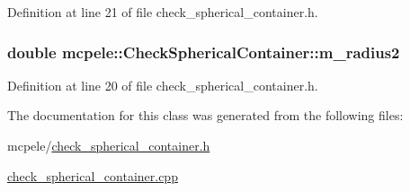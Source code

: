 \-Definition at line 21 of file check\-\_\-spherical\-\_\-container.\-h.

\hypertarget{classmcpele_1_1CheckSphericalContainer_a692b8da3daa2d45a7fc651d2ce045763}{
\subsubsection[{m\-\_\-radius2}]{\setlength{\rightskip}{0pt plus 5cm}double {\bf mcpele\-::\-Check\-Spherical\-Container\-::m\-\_\-radius2}}}\label{classmcpele_1_1CheckSphericalContainer_a692b8da3daa2d45a7fc651d2ce045763}


\-Definition at line 20 of file check\-\_\-spherical\-\_\-container.\-h.



\-The documentation for this class was generated from the following files\-:\begin{DoxyCompactItemize}
\item 
mcpele/\hyperlink{check__spherical__container_8h}{check\-\_\-spherical\-\_\-container.\-h}\item 
\hyperlink{check__spherical__container_8cpp}{check\-\_\-spherical\-\_\-container.\-cpp}\end{DoxyCompactItemize}
